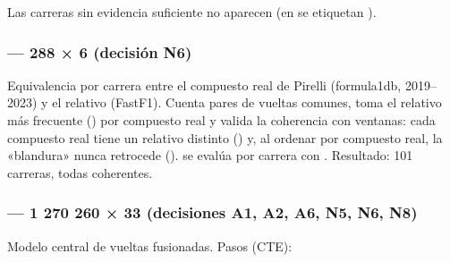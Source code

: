 Las carreras sin evidencia suficiente no aparecen (en  se etiquetan ).

\subsubsection{ — 288 × 6 (decisión N6)}

Equivalencia por carrera entre el compuesto real de Pirelli  (formula1db, 2019–2023) y el relativo  (FastF1). Cuenta pares de vueltas comunes, toma el relativo más frecuente () por compuesto real y valida la coherencia con ventanas: cada compuesto real tiene un relativo distinto () y, al ordenar por compuesto real, la «blandura» nunca retrocede ().  se evalúa por carrera con . Resultado: 101 carreras, todas coherentes.

\subsubsection{ — 1 270 260 × 33 (decisiones A1, A2, A6, N5, N6, N8)}

Modelo central de vueltas fusionadas. Pasos (CTE):

